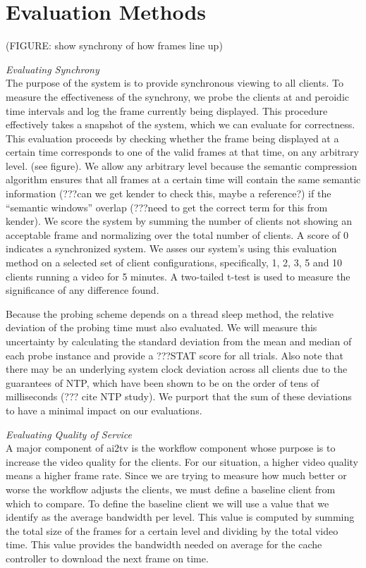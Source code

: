 \documentclass{sig-alternate}
\begin{document}
\section{Evaluation Methods} \label{eval}

(FIGURE: show synchrony of how frames line up)

\textit{Evaluating Synchrony} \\ The purpose of the system is to
provide synchronous viewing to all clients.  To measure the
effectiveness of the synchrony, we probe the clients at and peroidic
time intervals and log the frame currently being displayed.  This
procedure effectively takes a snapshot of the system, which we can
evaluate for correctness.  This evaluation proceeds by checking
whether the frame being displayed at a certain time corresponds to one
of the valid frames at that time, on any arbitrary level.  (see
figure).  We allow any arbitrary level because the semantic
compression algorithm ensures that all frames at a certain time will
contain the same semantic information (???can we get kender to check
this, maybe a reference?) if the ``semantic windows'' overlap (???need
to get the correct term for this from kender).  We score the system by
summing the number of clients not showing an acceptable frame and
normalizing over the total number of clients.  A score of 0 indicates
a synchronized system.  We asses our system's using this evaluation
method on a selected set of client configurations, specifically, 1, 2,
3, 5 and 10 clients running a video for 5 minutes.  A two-tailed
t-test is used to measure the significance of any difference found.

Because the probing scheme depends on a thread sleep method, the
relative deviation of the probing time must also evaluated.  We will
measure this uncertainty by calculating the standard deviation from
the mean and median of each probe instance and provide a ???STAT score
for all trials.  Also note that there may be an underlying system
clock deviation across all clients due to the guarantees of NTP, which
have been shown to be on the order of tens of milliseconds (??? cite
NTP study).  We purport that the sum of these deviations to have a
minimal impact on our evaluations.

\textit{Evaluating Quality of Service} \\
A major component of ai2tv is the workflow component whose
purpose is to increase the video quality for the clients.  For our
situation, a higher video quality means a higher frame rate.  Since we
are trying to measure how much better or worse the workflow adjusts
the clients, we must define a baseline client from which to compare.
To define the baseline client we will use a value that we identify as
the average bandwidth per level.  This value is computed by summing
the total size of the frames for a certain level and dividing by the
total video time.  This value provides the bandwidth needed on average
for the cache controller to download the next frame on time.
\end{document}
